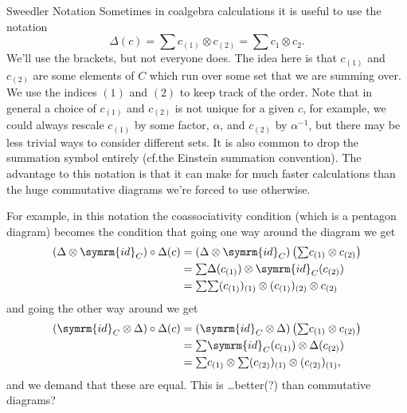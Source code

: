 \documentclass[fleqn]{NotesClass}
\newcommand{\id}{\symrm{id}}
\newcommand{\tsum}{{\textstyle \sum}}
\begin{document}
    \begin{ntn}{Sweedler Notation}{}
        Sometimes in coalgebra calculations it is useful to use the notation
        \begin{equation}
            \Delta(c) = \sum c_{(1)} \otimes c_{(2)} = \sum c_1 \otimes c_2.
        \end{equation}
        We'll use the brackets, but not everyone does.
        The idea here is that \(c_{(1)}\) and \(c_{(2)}\) are some elements of \(C\) which run over some set that we are summing over.
        We use the indices \((1)\) and \((2)\) to keep track of the order.
        Note that in general a choice of \(c_{(1)}\) and \(c_{(2)}\) is not unique for a given \(c\), for example, we could always rescale \(c_{(1)}\) by some factor, \(\alpha\), and \(c_{(2)}\) by \(\alpha^{-1}\), but there may be less trivial ways to consider different sets.
        It is also common to drop the summation symbol entirely (cf.\@ the Einstein summation convention).
        The advantage to this notation is that it can make for much faster calculations than the huge commutative diagrams we're forced to use otherwise.
        
        For example, in this notation the coassociativity condition (which is a pentagon diagram) becomes the condition that going one way around the diagram we get
        \begin{align}
            (\Delta \otimes \id_C) \circ \Delta(c) &= (\Delta \otimes \id_C)\left( \tsum c_{(1)} \otimes c_{(2)} \right)\\
            &= \tsum \Delta(c_{(1)}) \otimes \id_C(c_{(2)})\\
            &= \tsum \tsum (c_{(1)})_{(1)} \otimes (c_{(1)})_{(2)} \otimes c_{(2)}
        \end{align}
        and going the other way around we get
        \begin{align}
            (\id_C \otimes \Delta) \circ \Delta(c) &= (\id_C \otimes \Delta) \left( \tsum c_{(1)} \otimes c_{(2)} \right)\\
            &= \tsum \id_C(c_{(1)}) \otimes \Delta(c_{(2)})\\
            &= \tsum c_{(1)} \otimes \tsum (c_{(2)})_{(1)} \otimes (c_{(2)})_{(1)},
        \end{align}
        and we demand that these are equal.
        This is \dots better(?) than commutative diagrams?
        

\end{ntn}
\end{document}
